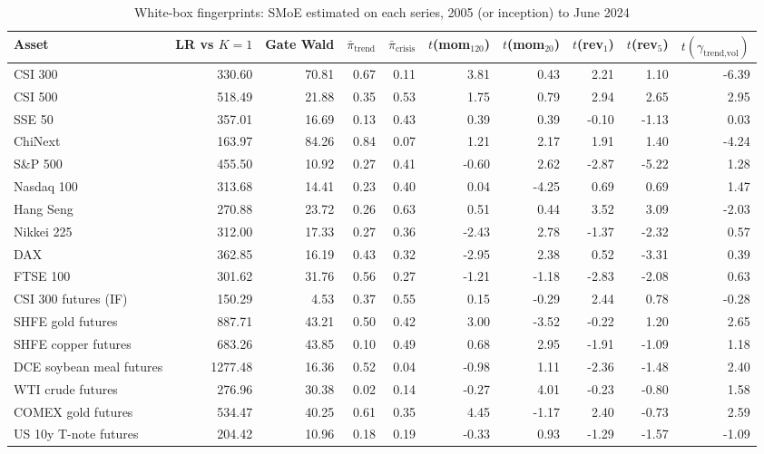 \begin{table}[!htbp]\centering\scriptsize
\caption{White-box fingerprints: SMoE estimated on each series, 2005 (or inception) to June 2024}\label{tab:fingerprints}
\begin{adjustbox}{max width=\textwidth}
\begin{tabular}{lrrrrrrrrr}
\toprule
Asset & LR vs $K{=}1$ & Gate Wald & $\bar\pi_{\text{trend}}$ & $\bar\pi_{\text{crisis}}$ & $t$(mom$_{120}$) & $t$(mom$_{20}$) & $t$(rev$_1$) & $t$(rev$_5$) & $t(\gamma_{\text{trend,vol}})$\\
\midrule
CSI 300 & 330.60 & 70.81 & 0.67 & 0.11 & 3.81 & 0.43 & 2.21 & 1.10 & -6.39\\
CSI 500 & 518.49 & 21.88 & 0.35 & 0.53 & 1.75 & 0.79 & 2.94 & 2.65 & 2.95\\
SSE 50 & 357.01 & 16.69 & 0.13 & 0.43 & 0.39 & 0.39 & -0.10 & -1.13 & 0.03\\
ChiNext & 163.97 & 84.26 & 0.84 & 0.07 & 1.21 & 2.17 & 1.91 & 1.40 & -4.24\\
S\&P 500 & 455.50 & 10.92 & 0.27 & 0.41 & -0.60 & 2.62 & -2.87 & -5.22 & 1.28\\
Nasdaq 100 & 313.68 & 14.41 & 0.23 & 0.40 & 0.04 & -4.25 & 0.69 & 0.69 & 1.47\\
Hang Seng & 270.88 & 23.72 & 0.26 & 0.63 & 0.51 & 0.44 & 3.52 & 3.09 & -2.03\\
Nikkei 225 & 312.00 & 17.33 & 0.27 & 0.36 & -2.43 & 2.78 & -1.37 & -2.32 & 0.57\\
DAX & 362.85 & 16.19 & 0.43 & 0.32 & -2.95 & 2.38 & 0.52 & -3.31 & 0.39\\
FTSE 100 & 301.62 & 31.76 & 0.56 & 0.27 & -1.21 & -1.18 & -2.83 & -2.08 & 0.63\\
CSI 300 futures (IF) & 150.29 & 4.53 & 0.37 & 0.55 & 0.15 & -0.29 & 2.44 & 0.78 & -0.28\\
SHFE gold futures & 887.71 & 43.21 & 0.50 & 0.42 & 3.00 & -3.52 & -0.22 & 1.20 & 2.65\\
SHFE copper futures & 683.26 & 43.85 & 0.10 & 0.49 & 0.68 & 2.95 & -1.91 & -1.09 & 1.18\\
DCE soybean meal futures & 1277.48 & 16.36 & 0.52 & 0.04 & -0.98 & 1.11 & -2.36 & -1.48 & 2.40\\
WTI crude futures & 276.96 & 30.38 & 0.02 & 0.14 & -0.27 & 4.01 & -0.23 & -0.80 & 1.58\\
COMEX gold futures & 534.47 & 40.25 & 0.61 & 0.35 & 4.45 & -1.17 & 2.40 & -0.73 & 2.59\\
US 10y T-note futures & 204.42 & 10.96 & 0.18 & 0.19 & -0.33 & 0.93 & -1.29 & -1.57 & -1.09\\

\end{tabular}
\end{adjustbox}
\end{table}
